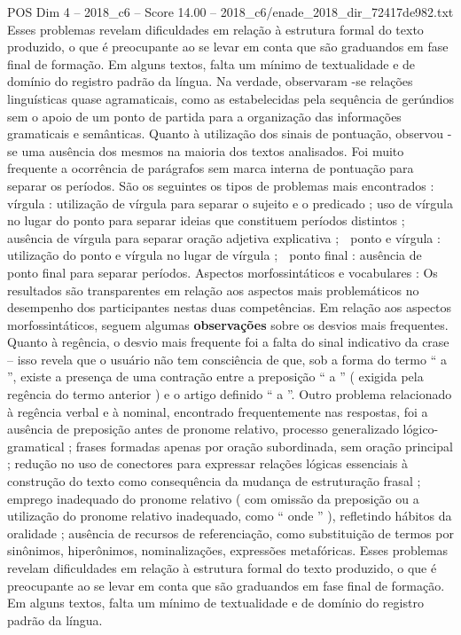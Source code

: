 \begin{textsample}{POS Dim 4 – 2018\_c6 – Score 14.00 – 2018\_c6/enade\_2018\_dir\_72417de982.txt}
Esses problemas revelam dificuldades em relação à estrutura formal do texto produzido, o que é preocupante ao se levar em conta que são graduandos em fase final de formação.
Em alguns textos, falta um mínimo de textualidade e de domínio do registro padrão da língua.
Na verdade, observaram -se relações linguísticas quase agramaticais, como as estabelecidas pela sequência de gerúndios sem o apoio de um ponto de partida para a organização das informações gramaticais e semânticas.
Quanto à utilização dos sinais de pontuação, observou -se uma ausência dos mesmos na maioria dos textos analisados.
Foi muito frequente a ocorrência de parágrafos sem marca interna de pontuação para separar os períodos.
São os seguintes os tipos de problemas mais encontrados :  vírgula : utilização de vírgula para separar o sujeito e o predicado ; uso de vírgula no lugar do ponto para separar ideias que constituem períodos distintos ; ausência de vírgula para separar oração adjetiva explicativa ;  ponto e vírgula : utilização do ponto e vírgula no lugar de vírgula ;  ponto final : ausência de ponto final para separar períodos.
Aspectos morfossintáticos e vocabulares : Os resultados são transparentes em relação aos aspectos mais problemáticos no desempenho dos participantes nestas duas competências.
Em relação aos aspectos morfossintáticos, seguem algumas \textbf{observações} sobre os desvios mais frequentes.
Quanto à regência, o desvio mais frequente foi a falta do sinal indicativo da crase – isso revela que o usuário não tem consciência de que, sob a forma do termo “ a ”, existe a presença de uma contração entre a preposição “ a ” ( exigida pela regência do termo anterior ) e o artigo definido “ a ”.
Outro problema relacionado à regência verbal e à nominal, encontrado frequentemente nas respostas, foi a ausência de preposição antes de pronome relativo, processo generalizado lógico-gramatical ; frases formadas apenas por oração subordinada, sem oração principal ; redução no uso de conectores para expressar relações lógicas essenciais à construção do texto como consequência da mudança de estruturação frasal ; emprego inadequado do pronome relativo ( com omissão da preposição ou a utilização do pronome relativo inadequado, como “ onde ” ), refletindo hábitos da oralidade ; ausência de recursos de referenciação, como substituição de termos por sinônimos, hiperônimos, nominalizações, expressões metafóricas.
Esses problemas revelam dificuldades em relação à estrutura formal do texto produzido, o que é preocupante ao se levar em conta que são graduandos em fase final de formação.
Em alguns textos, falta um mínimo de textualidade e de domínio do registro padrão da língua.

\end{textsample}
